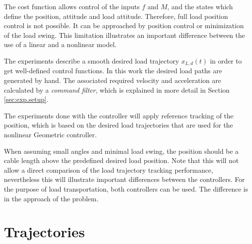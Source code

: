 The  cost function allows control of the inputs $ f $ and $ M $, and the states which define the  position,  attitude and load attitude. 
Therefore, full load position control is not possible. It can be approached by  position control or minimization of the load swing. This limitation illustrates an important difference between the use of a linear and a nonlinear model. 

The experiments describe a smooth desired load trajectory $ x_{L,d}(t) $ in order to get well-defined control functions.
In this work the desired load paths are generated by hand. The associated required velocity and acceleration are calculated by a \textit{command filter}, which is explained in more detail in Section \ref{sec:exp.setup}.

The experiments done with the  controller will apply reference tracking of the  position, which is based on the desired load trajectories that are used for the nonlinear Geometric controller. 

When assuming small angles and minimal load swing, the  position should be a cable length above the predefined desired load position. 
Note that this will not allow a direct comparison of the load trajectory tracking performance, nevertheless this will illustrate important differences between the controllers. 
For the purpose of load transportation, both controllers can be used. The difference is in the approach of the problem.



\newcommand{\caseA}{63}
\newcommand{\caseB}{61}
\newcommand{\caseC}{64}
\newpage
\section{Trajectories}\label{sec:exp.traj}

